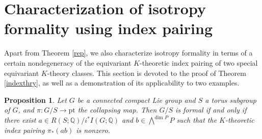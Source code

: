 \documentclass[11pt]{amsart}
\theoremstyle{plain}
\newtheorem{proposition}[theorem]{Proposition}
\theoremstyle{definition}
\begin{document}
\section{Characterization of isotropy formality using index pairing}
Apart from Theorem \ref{rep}, we also characterize isotropy formality in terms of a certain nondegeneracy of the equivariant $K$-theoretic index pairing of two special equivariant $K$-theory classes. This section is devoted to the proof of Theorem \ref{indexthry}, as well as a demonstration of its applicability to two examples.
	\begin{proposition}\label{nondegenformal}
		Let $G$ be a connected compact Lie group and $S$ a torus subgroup of $G$, and $\pi: G/S\to \text{pt}$ the collapsing map. Then $G/S$ is formal if and only if there exist $a\in R(S; \mathbb{Q})/i^*I(G; \mathbb{Q})$ and $b\in \bigwedge\nolimits^{\text{dim }P}P$ such that the $K$-theoretic index pairing $\pi_*(ab)$ is nonzero.
	\end{proposition}
\end{document}
